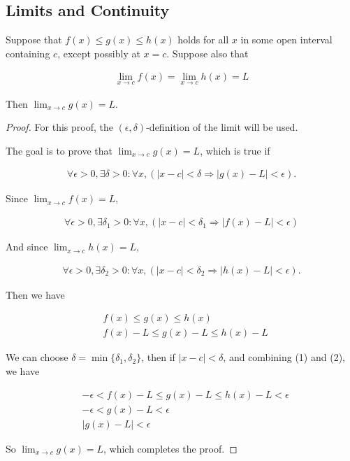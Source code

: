 \subsection{Limits and Continuity}

\begin{theorem}
	Suppose that $f(x) \leq g(x) \leq h(x)$ holds for all $x$ in some open interval containing $c$, except possibly at $x=c$. Suppose also that
	
	\begin{align*}
		\lim_{x \rightarrow c} f(x) = \lim_{x \rightarrow c} h(x) = L
	\end{align*}
	
	Then $\lim_{x \rightarrow c} g(x) = L $.
\end{theorem}

\begin{proof}
	For this proof, the $(\epsilon, \delta)$-definition of the limit will be used.
	
	The goal is to prove that $\lim_{x \rightarrow c} g(x) = L$, which is true if
	
	\begin{align*}
		\forall \epsilon > 0, \exists \delta > 0 : \forall x, (|x-c| < \delta \Rightarrow |g(x)-L| < \epsilon).
	\end{align*}
	
	Since $\lim_{x \rightarrow c} f(x) = L$,
	
	\begin{align}
		\forall \epsilon > 0, \exists \delta_1 > 0 : \forall x, (|x-c| < \delta_1 \Rightarrow |f(x)-L| < \epsilon)
	\end{align}
	
	And since $\lim_{x \rightarrow c} h(x) = L$,
	
	\begin{align}
		\forall \epsilon > 0, \exists \delta_2 > 0 : \forall x, (|x-c| < \delta_2 \Rightarrow |h(x)-L| < \epsilon).
	\end{align}
	
	Then we have 
	
	\begin{align*}
		&f(x) \leq g(x) \leq h(x) \\
		&f(x)-L \leq g(x)-L \leq h(x)-L
	\end{align*}
	
	We can choose $\delta = \min\{\delta_1, \delta_2\}$, then if $|x-c| < \delta$, and combining (1) and (2), we have
	
	\begin{align*}
		&-\epsilon < f(x)-L \leq g(x)-L \leq h(x)-L < \epsilon \\
		&-\epsilon < g(x)-L < \epsilon \\
		&|g(x)-L| < \epsilon
	\end{align*}
	
	So $\lim_{x \rightarrow c} g(x) = L$, which completes the proof.
\end{proof}
\newpage

